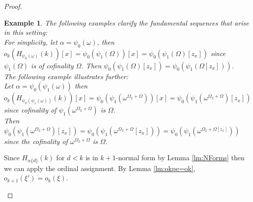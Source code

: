 \documentclass{amsart}
\theoremstyle{plain}
\theoremstyle{plain}
\newtheorem{example}[theorem]{Example}
\newcommand{\Om}{{\Omega}}
\newcommand{\okpe}{o_{k+1}}
\newcommand{\ok}{o_{k}}
\newcommand{\al}{{\alpha}}
\newcommand{\om}{\omega}
\begin{document}
\begin{proof}
\begin{Cases}
\begin{Cases}
\begin{Cases}
            \begin{example}
                The following examples clarify the fundamental sequences that arise in this setting:\\
                For simplicity, let $\al = \psi_0(\om)$, then $\ok(H_{\psi_0(\om)}(k))[x]= \psi_0(\psi_1(\Om))[x]= \psi_0(\psi_1(\Om)[z_x])$ since $\psi_1(\Om)$ is of cofinality $\Om$. Then $\psi_0(\psi_1(\Om)[z_x])= \psi_0(\psi_1(\Om[z_x]))$. \\
                The following example illustrates further:\\
                Let $\al = \psi_0(\psi_1(\om))$ then $\ok(H_{\psi_0(\psi_1(\om))}(k))[x] = \psi_0(\psi_1(\om^{\Om_2+\Om}))[x]= \psi_0(\psi_1(\om^{\Om_2+\Om})[z_x])$ since cofinality of $\psi_1(\om^{\Om_2+\Om})$ is $\Om$.\\
                Then
                $ \psi_0(\psi_1(\om^{\Om_2+\Om})[z_x])= \psi_0(\psi_1(\om^{\Om_2+\Om}[z_x]))= \psi_0(\psi_1(\om^{\Om_2+\Om[z_x]}))$ since the cofinality of $\om^{\Om_2+\Om}$ is $\Om$.\\
            \end{example}
            
            Since $H_{\al\{d\}}(k)$ for $d<k$ is in $k+1$-normal form by Lemma \ref{lm:NForms} then we can apply the ordinal assignment.
            By Lemma \ref{lm:okpe=ok}, $\okpe(\xi')=\ok(\xi)$.
            

\end{Cases}
\end{Cases}
\end{Cases}
\end{proof}
\end{document}
